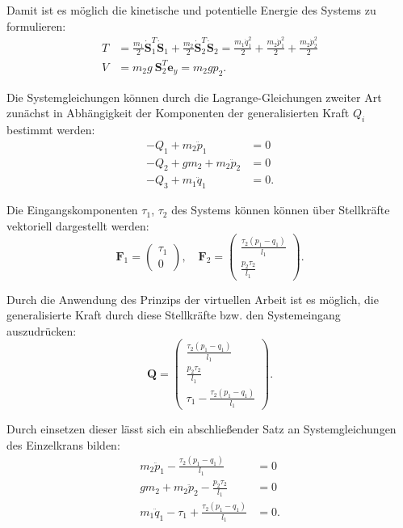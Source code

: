 Damit ist es möglich die kinetische und potentielle Energie des Systems zu formulieren:
\begin{align}
	T &= \frac{m_1}{2} \dot{\mathbf{S}}_1^T \dot{\mathbf{S}}_1 + \frac{m_2}{2} \dot{\mathbf{S}}_2^T \dot{\mathbf{S}}_2 = \frac{m_{1} \dot{q}_{1}^{2}}{2} + \frac{m_{2} \dot{p}_{1}^{2}}{2} + \frac{m_{2} \dot{p}_{2}^{2}}{2} \\
	V &= m_2 g \ \mathbf{S}_2^T \mathbf{e}_y = m_{2} g p_{2}.
\end{align}

Die Systemgleichungen können durch die Lagrange-Gleichungen zweiter Art zunächst in Abhängigkeit der Komponenten der generalisierten Kraft $Q_i$ bestimmt werden:
\begin{align}
	- Q_{1} + m_{2} \ddot{p}_{1} &= 0\\
	- Q_{2} + g m_{2} + m_{2} \ddot{p}_{2} &= 0\\
	- Q_{3} + m_{1} \ddot{q}_{1} &= 0.
\end{align}

Die Eingangskomponenten $\tau_1$, $\tau_2$ des Systems können können über Stellkräfte vektoriell dargestellt werden:
\begin{equation}
	\mathbf{F}_1 =
	\left(\begin{matrix}
		\tau_{1} \\
		0
	\end{matrix}\right), \quad
	\mathbf{F}_2 =
	\left(\begin{matrix}
		\frac{\tau_{2} \left(p_{1} - q_{1}\right)}{l_{1}}\\
		\frac{p_{2} \tau_{2}}{l_{1}}
	\end{matrix}\right).
\end{equation}

Durch die Anwendung des Prinzips der virtuellen Arbeit ist es möglich, die generalisierte Kraft durch diese Stellkräfte bzw. den Systemeingang auszudrücken:
\begin{equation}
	\mathbf{Q}=
	\left(\begin{matrix}
		\frac{\tau_{2} \left(p_{1} - q_{1}\right)}{l_{1}}\\
		\frac{p_{2} \tau_{2}}{l_{1}}\\
		\tau_{1} - \frac{\tau_{2} \left(p_{1} - q_{1}\right)}{l_{1}}
	\end{matrix}\right).
\end{equation}

Durch einsetzen dieser lässt sich ein abschließender Satz an Systemgleichungen des Einzelkrans bilden:
\begin{align}
	m_{2} \ddot{p}_{1} - \frac{\tau_{2} \left(p_{1} - q_{1}\right)}{l_{1}} &= 0 \label{single_flat_syseq1}\\
	g m_{2} + m_{2} \ddot{p}_{2} - \frac{p_{2} \tau_{2}}{l_{1}} &= 0\label{single_flat_syseq2}\\
	m_{1} \ddot{q}_{1} - \tau_{1} + \frac{\tau_{2} \left(p_{1} - q_{1}\right)}{l_{1}} &= 0\label{single_flat_syseq3}.
\end{align}

